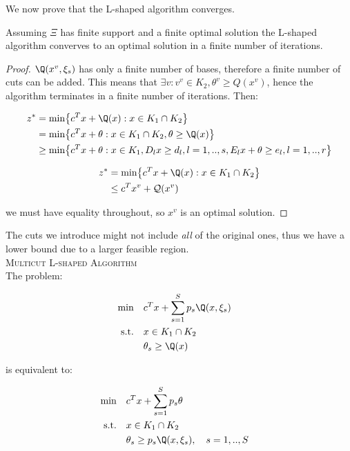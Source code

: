 We now prove that the L-shaped algorithm converges.

\begin{thm}
Assuming $\Xi$ has finite support and a finite optimal solution the L-shaped algorithm
converves to an optimal solution in a finite number of iterations.
\end{thm}

\begin{proof}
$\Q(x^v, \xi_s)$ has only a finite number of bases, therefore a finite number of cuts
can be added. This means that $\exists v : v^v \in K_2, \theta^v \geq Q(x^v)$, hence
the algorithm terminates in a finite number of iterations.
Then:

\begin{alignat*}{2}
z^* & = \textrm{min} \big\{ c^T x + \Q(x) : x \in K_1 \cap K_2 \big\} \\
    & = \textrm{min} \big\{ c^T x + \theta : x \in K_1 \cap K_2, \theta \geq \Q(x) \big\} \\
    & \geq \textrm{min} \big\{ c^T x + \theta : x \in K_1, D_l x \geq d_l, l=1,..,s , E_l x + \theta \geq e_l, l=1,..,r \big\}
\end{alignat*}

\begin{alignat*}{2}
z^* & = \textrm{min} \big\{ c^T x + \Q(x) : x \in K_1 \cap K_2 \big\} \\
    & \leq c^Tx^v + \mathcal{Q}(x^v)
\end{alignat*}

we must have equality throughout, so $x^v$ is an optimal solution.
\end{proof}

The cuts we introduce might not include \emph{all} of the original ones, thus
we have a lower bound due to a larger feasible region.\\

\textsc{Multicut L-shaped Algorithm}\\

The problem:

\begin{alignat*}{2}
\textrm{min}  \quad & c^Tx + \sum_{s=1}^S p_s \Q(x,\xi_s) \\
\textrm{s.t.} \quad & x\in K_1 \cap K_2 & \\
                    & \theta_s \geq \Q(x) &
\end{alignat*}

is equivalent to:

\begin{alignat*}{2}
\textrm{min}  \quad & c^Tx + \sum_{s=1}^S p_s \theta \ \\
\textrm{s.t.} \quad & x\in K_1 \cap K_2 & \\
                    & \theta_s \geq p_s \Q(x, \xi_s), \quad s=1,..,S &
\end{alignat*}

